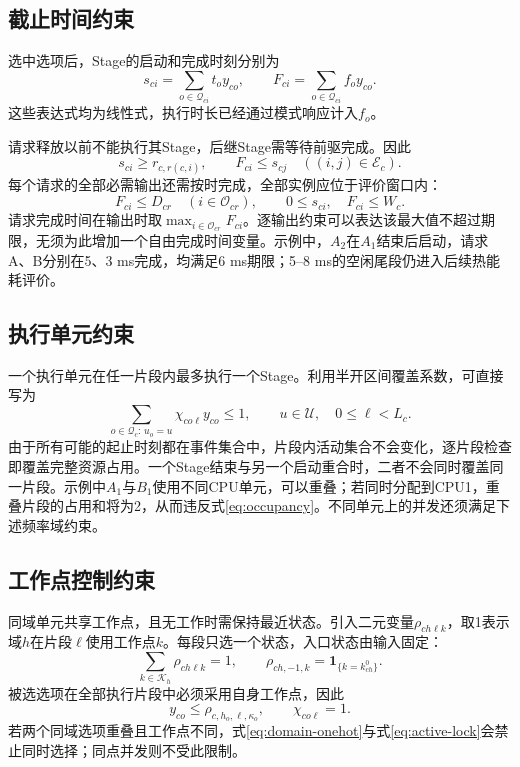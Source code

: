 \subsection{截止时间约束}

选中选项后，Stage的启动和完成时刻分别为
\begin{equation}
s_{ci}=\sum_{o\in\mathcal Q_{ci}}t_oy_{co},\qquad
F_{ci}=\sum_{o\in\mathcal Q_{ci}}f_oy_{co}.
\label{eq:option-times}
\end{equation}
这些表达式均为线性式，执行时长已经通过模式响应计入\(f_o\)。

请求释放以前不能执行其Stage，后继Stage需等待前驱完成。因此
\begin{equation}
s_{ci}\ge r_{c,r(c,i)},\qquad
F_{ci}\le s_{cj}\quad ((i,j)\in\mathcal E_c).
\label{eq:precedence}
\end{equation}
每个请求的全部必需输出还需按时完成，全部实例应位于评价窗口内：
\begin{equation}
F_{ci}\le D_{cr}\quad(i\in\mathcal O_{cr}),\qquad
0\le s_{ci},\quad F_{ci}\le W_c.
\label{eq:deadlines}
\end{equation}
请求完成时间在输出时取\(\max_{i\in\mathcal O_{cr}}F_{ci}\)。逐输出约束可以表达该最大值不超过期限，无须为此增加一个自由完成时间变量。示例中，\(A_2\)在\(A_1\)结束后启动，请求A、B分别在5、3 ms完成，均满足6 ms期限；5--8 ms的空闲尾段仍进入后续热能耗评价。

\subsection{执行单元约束}

一个执行单元在任一片段内最多执行一个Stage。利用半开区间覆盖系数，可直接写为
\begin{equation}
\sum_{o\in\mathcal Q_c:\,u_o=u}\chi_{co\ell}y_{co}\le1,
\qquad u\in\mathcal U,\quad 0\le\ell<L_c.
\label{eq:occupancy}
\end{equation}
由于所有可能的起止时刻都在事件集合中，片段内活动集合不会变化，逐片段检查即覆盖完整资源占用。一个Stage结束与另一个启动重合时，二者不会同时覆盖同一片段。示例中\(A_1\)与\(B_1\)使用不同CPU单元，可以重叠；若同时分配到CPU1，重叠片段的占用和将为2，从而违反式\eqref{eq:occupancy}。不同单元上的并发还须满足下述频率域约束。

\subsection{工作点控制约束}

同域单元共享工作点，且无工作时需保持最近状态。引入二元变量\(\rho_{ch\ell k}\)，取1表示域\(h\)在片段\(\ell\)使用工作点\(k\)。每段只选一个状态，入口状态由输入固定：
\begin{equation}
\sum_{k\in\mathcal K_h}\rho_{ch\ell k}=1,
\qquad \rho_{ch,-1,k}=\mathbf1_{\{k=k^0_{ch}\}}.
\label{eq:domain-onehot}
\end{equation}
被选选项在全部执行片段中必须采用自身工作点，因此
\begin{equation}
y_{co}\le\rho_{c,h_o,\ell,\kappa_o},
\qquad \chi_{co\ell}=1.
\label{eq:active-lock}
\end{equation}
若两个同域选项重叠且工作点不同，式\eqref{eq:domain-onehot}与式\eqref{eq:active-lock}会禁止同时选择；同点并发则不受此限制。

